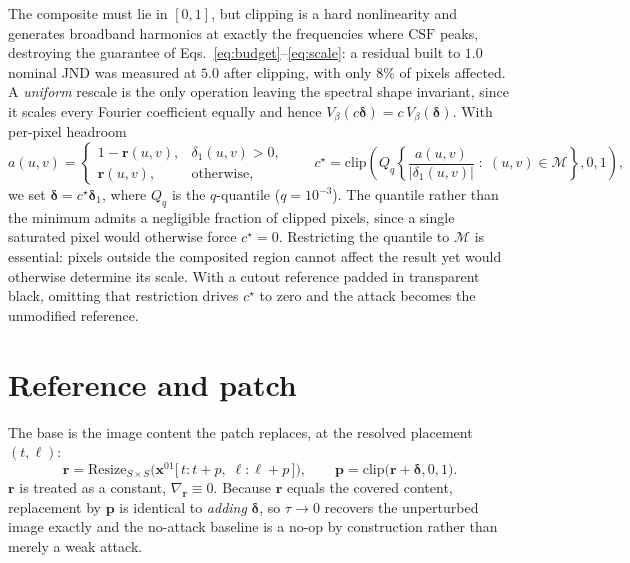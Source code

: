 \documentclass[11pt,a4paper]{article}
\begin{document}
The composite must lie in $[0,1]$, but clipping is a hard nonlinearity
and generates broadband harmonics at exactly the frequencies where
$\mathrm{CSF}$ peaks, destroying the guarantee of
Eqs.~\eqref{eq:budget}--\eqref{eq:scale}: a residual built to $1.0$
nominal JND was measured at $5.0$ after clipping, with only $8\%$ of
pixels affected. A \emph{uniform} rescale is the only operation leaving
the spectral shape invariant, since it scales every Fourier coefficient
equally and hence
$V_\beta(c\boldsymbol{\delta})=c\,V_\beta(\boldsymbol{\delta})$. With
per-pixel headroom
\begin{equation}
  a(u,v)=\begin{cases}
    1-\mathbf{r}(u,v), & \delta_1(u,v)>0,\\
    \mathbf{r}(u,v),   & \text{otherwise,}
  \end{cases}
  \qquad
  c^{\star}=\mathrm{clip}\!\left(
  Q_q\!\left\{\frac{a(u,v)}{|\delta_1(u,v)|}\;:\;(u,v)\in\mathcal{M}\right\},0,1\right),
  \label{eq:fit}
\end{equation}
we set $\boldsymbol{\delta}=c^{\star}\boldsymbol{\delta}_1$, where $Q_q$
is the $q$-quantile ($q=10^{-3}$). The quantile rather than the minimum
admits a negligible fraction of clipped pixels, since a single saturated
pixel would otherwise force $c^{\star}=0$. Restricting the quantile to
$\mathcal{M}$ is essential: pixels outside the composited region cannot
affect the result yet would otherwise determine its scale. With a cutout
reference padded in transparent black, omitting that restriction drives
$c^{\star}$ to zero and the attack becomes the unmodified reference.

\section{Reference and patch}

The base is the image content the patch replaces, at the resolved
placement $(t,\ell)$:
\begin{equation}
  \mathbf{r}=\mathrm{Resize}_{S\times S}
  \Big(\mathbf{x}^{01}\big[\,t:t{+}p,\;\ell:\ell{+}p\,\big]\Big),
  \qquad
  \mathbf{p}=\mathrm{clip}\big(\mathbf{r}+\boldsymbol{\delta},0,1\big).
  \label{eq:patch}
\end{equation}
$\mathbf{r}$ is treated as a constant, $\nabla_{\mathbf{r}}\equiv0$.
Because $\mathbf{r}$ equals the covered content, replacement by
$\mathbf{p}$ is identical to \emph{adding} $\boldsymbol{\delta}$, so
$\tau\to0$ recovers the unperturbed image exactly and the no-attack
baseline is a no-op by construction rather than merely a weak attack.
\end{document}
